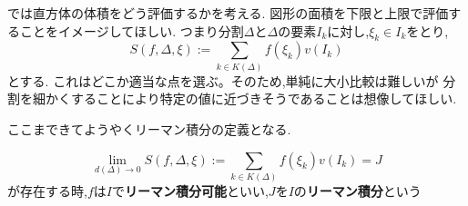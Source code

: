 では直方体の体積をどう評価するかを考える.
図形の面積を下限と上限で評価することをイメージしてほしい.
つまり分割$\Delta$と$\Delta$の要素$I_k$に対し,$\xi_k \in I_k$をとり,
\begin{equation*}
S(f, \Delta, \xi):= \sum_{k \in K(\Delta)} f(\xi_k)v(I_k)
\end{equation*}
とする.
これはどこか適当な点を選ぶ。そのため,単純に大小比較は難しいが
分割を細かくすることにより特定の値に近づきそうであることは想像してほしい.

ここまできてようやくリーマン積分の定義となる.


\begin{screen}
\begin{dfn}
\begin{equation*}
\lim_{d(\Delta) \to 0} S(f, \Delta, \xi):= \sum_{k \in K(\Delta)} f(\xi_k)v(I_k) = J
\end{equation*}
が存在する時,$f$は$I$で\textbf{リーマン積分可能}といい,$J$を$I$の\textbf{リーマン積分}という
\end{dfn}
\end{screen}
